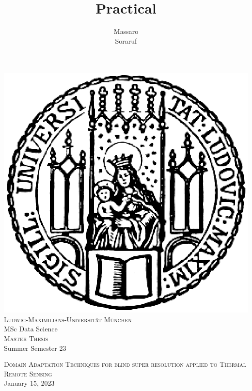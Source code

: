 \documentclass[11pt]{article}
\title{Practical}
\author{Massaro\\ Soraruf}
\numberwithin{figure}{section}
\numberwithin{table}{section}
\begin{document}
\pagestyle{fancy}
\renewcommand{\sectionmark}[1]{\markboth{}{\thesection\ \ #1}}
\lhead{}
\chead{}
\rhead{\rightmark}
\lfoot{}
\cfoot{}
\rfoot{\thepage}

%
%
\begin{titlepage}

\thispagestyle{empty}

\begin{center}
\includegraphics[scale=0.5]{Includes/0-siegel.eps}\\
\large{\textsc{Ludwig-Maximilians-Universität München}}\\
\large{MSc Data Science }\\
{\textsc{Master Thesis}} \\ 
\vspace{0.5cm}
\small{Summer Semester 23 }
\end{center}

\vspace{2cm}


\begin{center}
\Large{\textsc{ Domain Adaptation Techniques for blind super resolution applied to Thermal Remote Sensing}} \\
January 15, 2023
\end{center}

\vspace{2cm}


\end{titlepage}
\end{document}
